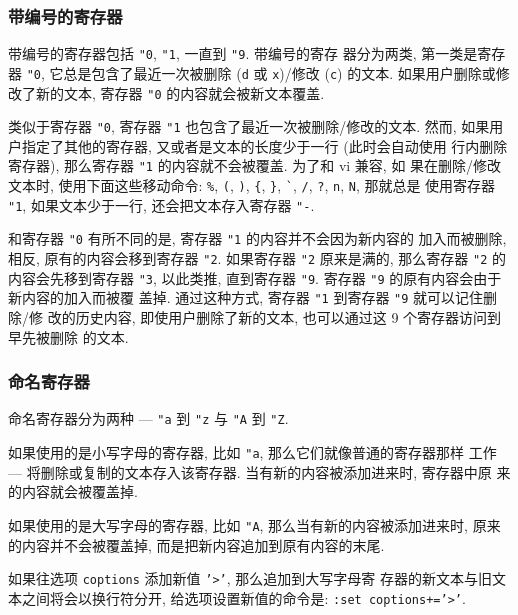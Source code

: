 \subsubsection{带编号的寄存器}
\label{subsubsec:the_numberred_registers}

带编号的寄存器包括 \texttt{"0}, \texttt{"1}, 一直到 \texttt{"9}. 带编号的寄存
器分为两类, 第一类是寄存器 \texttt{"0}, 它总是包含了最近一次被删除 (\texttt{d}
或 \texttt{x})/修改 (\texttt{c}) 的文本. 如果用户删除或修改了新的文本, 寄存器
\texttt{"0} 的内容就会被新文本覆盖.

类似于寄存器 \texttt{"0}, 寄存器 \texttt{"1} 也包含了最近一次被删除/修改的文本.
然而, 如果用户指定了其他的寄存器, 又或者是文本的长度少于一行 (此时会自动使用
行内删除寄存器), 那么寄存器 \texttt{"1} 的内容就不会被覆盖. 为了和 vi 兼容, 如
果在删除/修改文本时, 使用下面这些移动命令: \verb'%', \verb'(', \verb')',
\verb'{', \verb'}', \verb'`', \verb'/', \verb'?', \verb'n', \verb'N', 那就总是
使用寄存器 \texttt{"1}, 如果文本少于一行, 还会把文本存入寄存器 \texttt{"-}.

和寄存器 \texttt{"0} 有所不同的是, 寄存器 \texttt{"1} 的内容并不会因为新内容的
加入而被删除, 相反, 原有的内容会移到寄存器 \texttt{"2}. 如果寄存器 \texttt{"2}
原来是满的, 那么寄存器 \texttt{"2} 的内容会先移到寄存器 \texttt{"3}, 以此类推,
直到寄存器 \texttt{"9}. 寄存器 \texttt{"9} 的原有内容会由于新内容的加入而被覆
盖掉. 通过这种方式, 寄存器 \texttt{"1} 到寄存器 \texttt{"9} 就可以记住删除/修
改的历史内容, 即使用户删除了新的文本, 也可以通过这 9 个寄存器访问到早先被删除
的文本.

\subsubsection{命名寄存器}
\label{subsubsec:the_named_registers}

命名寄存器分为两种 --- \texttt{"a} 到 \texttt{"z} 与 \texttt{"A} 到
\texttt{"Z}.

如果使用的是小写字母的寄存器, 比如 \texttt{"a}, 那么它们就像普通的寄存器那样
工作 --- 将删除或复制的文本存入该寄存器. 当有新的内容被添加进来时, 寄存器中原
来的内容就会被覆盖掉.

如果使用的是大写字母的寄存器, 比如 \texttt{"A}, 那么当有新的内容被添加进来时,
原来的内容并不会被覆盖掉, 而是把新内容追加到原有内容的末尾.

\begin{warning}
    如果往选项 \texttt{coptions} 添加新值 \texttt{'>'}, 那么追加到大写字母寄
    存器的新文本与旧文本之间将会以换行符分开, 给选项设置新值的命令是:
    \texttt{:set coptions+='>'}.
\end{warning}

